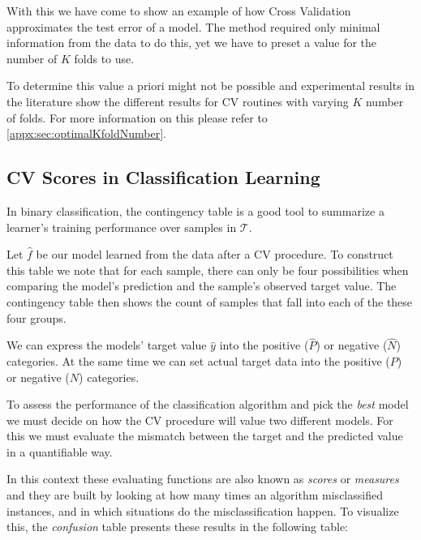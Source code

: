 With this we have come to show an example of how Cross Validation approximates the test error of a model.
The method required only minimal information from the data to do this, yet we have to preset a value for the number of $K$ folds to use.

To determine this value a priori might not be possible and experimental results in the literature show the different results for CV routines with varying $K$ number of folds.
For more information on this please refer to \cref{appx:sec:optimalKfoldNumber}.


\subsection{CV Scores in Classification Learning}\label{section:scoring_functions}

In binary classification, the contingency table is a good tool to summarize a learner's training performance over samples in $\mathcal{T}$.

Let $\hat{f}$ be our model learned from the data after a CV procedure.
To construct this table we note that for each sample, there can only be four possibilities when comparing the model's prediction and the sample's observed target value.
The contingency table then shows the count of samples that fall into each of the these four groups.

We can express the models' target value $\hat{y}$ into the positive ($\hat{P}$) or negative ($\hat{N}$) categories.
At the same time we can set actual target data into the positive ($P$) or negative ($N$) categories.

To assess the performance of the classification algorithm and pick the \textit{best} model we must decide on how the CV procedure will value two different models.
For this we must evaluate the mismatch between the target and the predicted value in a quantifiable way.

In this context these evaluating functions are also known as \textit{scores} or \textit{measures} and they are built by looking at how many times an algorithm misclassified instances, and in which situations do the misclassification happen.
To visualize this, the \textit{confusion} table presents these results in the following table:

